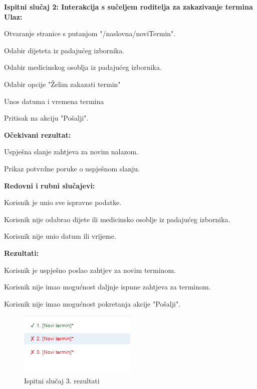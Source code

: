 \noindent	\textbf{Ispitni slučaj 2: Interakcija s sučeljem roditelja za zakazivanje termina}
\\
\noindent \textbf{Ulaz:}
\begin{packed_enum}
	\item Otvaranje stranice s putanjom "/naslovna/noviTermin".
	\item Odabir dijeteta iz padajućeg izbornika.
	\item Odabir medicinskog osoblja iz padajućeg izbornika.
	\item Odabir opcije "Želim zakazati termin"
	\item Unos datuma i vremena termina
	\item Pritisak na akciju "Pošalji".
\end{packed_enum}

\noindent \textbf{Očekivani rezultat:}
\begin{packed_enum}
	\item Uspješna slanje zahtjeva za novim nalazom.
	\item Prikaz potvrdne poruke o uspješnom slanju.
\end{packed_enum}

\noindent \textbf{Redovni i rubni slučajevi:}
\begin{packed_enum}
	\item Korisnik je unio sve ispravne podatke.
	\item Korisnik nije odabrao dijete ili medicinsko osoblje iz padajućeg izbornika.
	\item Korisnik nije unio datum ili vrijeme.
\end{packed_enum}

\noindent \textbf{Rezultati:}
\begin{packed_enum}
	\item Korisnik je uspješno poslao zahtjev za novim terminom.
	\item Korisnik nije imao mogućnost daljnje ispune zahtjeva za terminom.
	\item Korisnik nije imao mogućnost pokretanja akcije "Pošalji".
\end{packed_enum}

\begin{figure}[H]
	\includegraphics[scale=0.6]{dijagrami/test3.PNG}
	\centering
	\caption{Ispitni slučaj 3. rezultati}
	\label{fig:myChart}
\end{figure}

